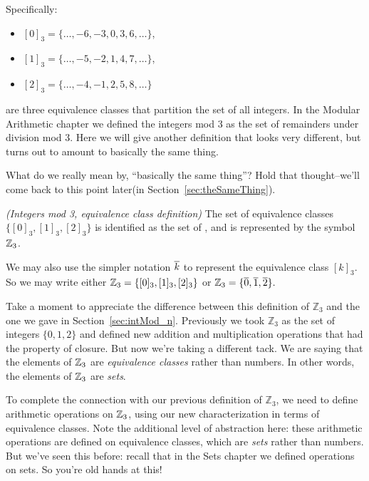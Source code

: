 \noindent
Specifically:
\begin{itemize}
\item[]
$[0]_3 = \{ \ldots, -6, -3, 0, 3, 6, \ldots \}$,
\item[]
$[1]_3 = \{ \ldots, -5, -2, 1, 4, 7, \ldots \}$,
\item[]
$[2]_3 = \{ \ldots, -4, -1, 2, 5, 8, \ldots \}$
\end{itemize}
are three equivalence classes that partition the set of all  integers.
In the Modular Arithmetic chapter we defined the integers mod 3 as the set of remainders under division mod 3. Here we will give another definition that looks very different, but turns out to amount to basically the same thing.

\begin{rem}
What do we really mean by, ``basically the same thing''? Hold that thought--we'll come back to this point later(in Section~\ref{sec:theSameThing}).
 \end{rem}

\begin{defn}\label{mod_eqiv_def_3} \emph{(Integers mod 3, equivalence class definition)}
The set of equivalence classes $\{ [0]_3, [1]_3, [2]_3 \}$ is identified as the set of , and is represented by the symbol~$\mathbb{Z}_3$.

We may also use the simpler notation $\overline{k}$ to represent the equivalence class  $[k]_3$. So we may write either  
$\mathbb{Z}_3 = \{ [0]_3, [1]_3, [2]_3 \}$ or $\mathbb{Z}_3 = \{ \overline{0}, \overline{1}, \overline{2} \} .$
\end{defn}

Take a moment to appreciate the difference between this definition of $\mathbb{Z}_3$  and the one we gave in Section~\ref{sec:intMod_n}. Previously we took $\mathbb{Z}_3$ as the set of integers $\{0,1,2\}$ and defined new addition and multiplication operations that had the property of closure. But now we're taking a different tack. We are saying that the elements of $\mathbb{Z}_3$ are \emph{equivalence classes} rather than numbers. In other words, the elements of $\mathbb{Z}_3$ are \emph{sets}.

To complete the connection with our previous definition of  $\mathbb{Z}_3$, we need to define arithmetic operations on $\mathbb{Z}_3$, using our new characterization in terms of equivalence classes. Note the additional level of abstraction here: these arithmetic operations are defined on equivalence classes, which are \emph{sets} rather than numbers. But we've seen this before: recall that in the Sets chapter we defined operations on sets. So you're old hands at this!

